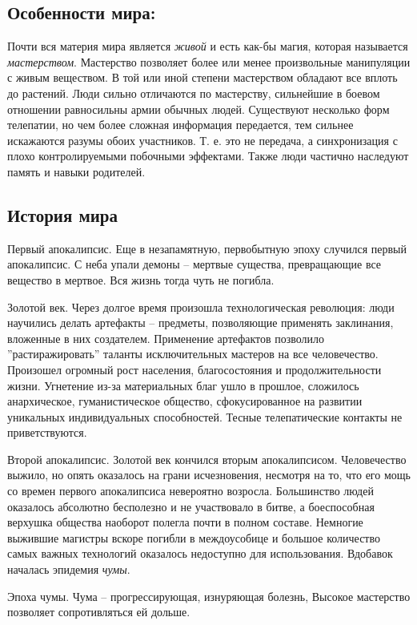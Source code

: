 \documentclass[12pt,a4paper]{article}
\begin{document}
\thispagestyle{empty}

\subsection*{Особенности мира:}

Почти вся материя мира является \textit{живой} и есть как-бы магия, которая называется \textit{мастерством}. Мастерство позволяет более или менее произвольные манипуляции с живым веществом. В той или иной степени мастерством обладают все вплоть до растений. Люди сильно отличаются по мастерству, сильнейшие в боевом отношении равносильны армии обычных людей.
Существуют несколько форм телепатии, но чем более сложная информация передается, тем сильнее искажаются разумы обоих участников. Т. е. это не передача, а синхронизация с плохо контролируемыми побочными эффектами.
Также люди частично наследуют память и навыки родителей.

\subsection*{История мира}
Первый апокалипсис. Еще в незапамятную, первобытную эпоху случился первый апокалипсис. С неба упали демоны -- мертвые существа, превращающие все вещество в мертвое. Вся жизнь тогда чуть не погибла.

Золотой век. Через долгое время произошла технологическая революция: люди научились делать артефакты -- предметы, позволяющие применять заклинания, вложенные в них создателем. Применение артефактов позволило ''растиражировать'' таланты исключительных мастеров на все человечество. Произошел огромный рост населения, благосостояния и продолжительности жизни. Угнетение из-за материальных благ ушло в прошлое, сложилось анархическое, гуманистическое общество, сфокусированное на развитии уникальных индивидуальных способностей. Тесные телепатические контакты не приветствуются.

Второй апокалипсис. Золотой век кончился вторым апокалипсисом. Человечество выжило, но опять оказалось на грани исчезновения, несмотря на то, что его мощь со времен первого апокалипсиса невероятно возросла. Большинство людей оказалось абсолютно бесполезно и не участвовало в битве, а боеспособная верхушка общества наоборот полегла почти в полном составе. Немногие выжившие магистры вскоре погибли в междоусобице и большое количество самых важных технологий оказалось недоступно для использования. Вдобавок началась эпидемия \textit{чумы}. 

Эпоха чумы. Чума -- прогрессирующая, изнуряющая болезнь, Высокое мастерство позволяет сопротивляться ей дольше.
\end{document}
